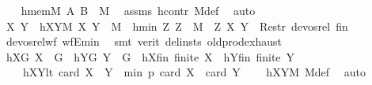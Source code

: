 \begin{isabellebody}
\ \ \isamarkupfalse%
\ hmemM{\isacharcolon}{\kern0pt}\ {\isachardoublequoteopen}{\isacharparenleft}{\kern0pt}A{\isacharcomma}{\kern0pt}\ B{\isacharparenright}{\kern0pt}\ {\isasymin}\ M{\isachardoublequoteclose}\ \isamarkupfalse%
\ assms\ hcontr\ M{\isacharunderscore}{\kern0pt}def\ \isamarkupfalse%
\ auto\isanewline
\ \ \isamarkupfalse%
\ \isamarkupfalse%
\ X\ Y\ \ hXYM{\isacharcolon}{\kern0pt}\ {\isachardoublequoteopen}{\isacharparenleft}{\kern0pt}X{\isacharcomma}{\kern0pt}\ Y{\isacharparenright}{\kern0pt}\ {\isasymin}\ M{\isachardoublequoteclose}\ \ hmin{\isacharcolon}{\kern0pt}\ {\isachardoublequoteopen}{\isasymAnd}Z{\isachardot}{\kern0pt}\ Z\ {\isasymin}\ M\ {\isasymLongrightarrow}\ {\isacharparenleft}{\kern0pt}Z{\isacharcomma}{\kern0pt}\ {\isacharparenleft}{\kern0pt}X{\isacharcomma}{\kern0pt}\ Y{\isacharparenright}{\kern0pt}{\isacharparenright}{\kern0pt}\ {\isasymnotin}\ Restr\ devos{\isacharunderscore}{\kern0pt}rel\ {\isacharquery}{\kern0pt}fin{\isachardoublequoteclose}\ \isanewline
\ \ \ \ \isamarkupfalse%
\ devos{\isacharunderscore}{\kern0pt}rel{\isacharunderscore}{\kern0pt}wf\ wfE{\isacharunderscore}{\kern0pt}min\ \isamarkupfalse%
\ {\isacharparenleft}{\kern0pt}smt\ {\isacharparenleft}{\kern0pt}verit{\isacharcomma}{\kern0pt}\ del{\isacharunderscore}{\kern0pt}insts{\isacharparenright}{\kern0pt}\ old{\isachardot}{\kern0pt}prod{\isachardot}{\kern0pt}exhaust{\isacharparenright}{\kern0pt}\isanewline
\ \ \isamarkupfalse%
\ hXG{\isacharcolon}{\kern0pt}\ {\isachardoublequoteopen}X\ {\isasymsubseteq}\ G{\isachardoublequoteclose}\ \ hYG{\isacharcolon}{\kern0pt}\ {\isachardoublequoteopen}Y\ {\isasymsubseteq}\ G{\isachardoublequoteclose}\ \ hXfin{\isacharcolon}{\kern0pt}\ {\isachardoublequoteopen}finite\ X{\isachardoublequoteclose}\ \ hYfin{\isacharcolon}{\kern0pt}\ {\isachardoublequoteopen}finite\ Y{\isachardoublequoteclose}\ \ \isanewline
\ \ \ \ hXYlt{\isacharcolon}{\kern0pt}\ {\isachardoublequoteopen}card\ {\isacharparenleft}{\kern0pt}X\ {\isasymcdots}\ Y{\isacharparenright}{\kern0pt}\ {\isacharless}{\kern0pt}\ min\ p\ {\isacharparenleft}{\kern0pt}card\ X\ {\isacharplus}{\kern0pt}\ card\ Y\ {\isacharminus}{\kern0pt}\ {}{\isacharparenright}{\kern0pt}{\isachardoublequoteclose}\ \isamarkupfalse%
\ hXYM\ M{\isacharunderscore}{\kern0pt}def\ \isamarkupfalse%
\ auto\isanewline
\ \ \isamarkupfalse%

\end{isabellebody}
